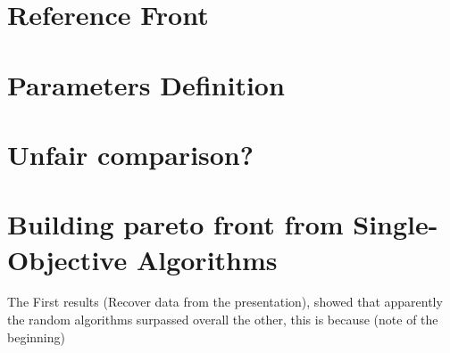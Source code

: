 \section{Reference Front}

\section{Parameters Definition}



\section{Unfair comparison?}

\section{Building pareto front from Single-Objective Algorithms}


The First results (Recover data from the presentation), showed that apparently the random algorithms surpassed overall the other, this is because (note of the beginning) 